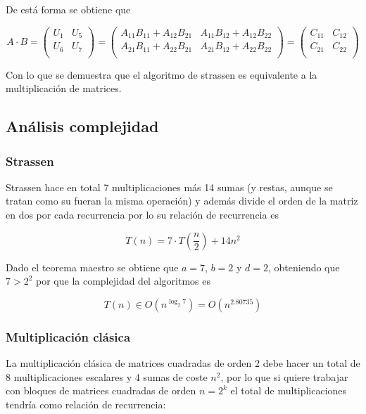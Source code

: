 \documentclass[12pt,letterpaper]{scrartcl}
\begin{document}
De está forma se obtiene que

$$
A\cdot B =
\begin{pmatrix}
	U_1 & U_5\\
	U_6 & U_7\\
\end{pmatrix}
 = \begin{pmatrix}
A_{11} B_{11} + A_{12} B_{21} & A_{11} B_{12} + A_{12} B_{22}\\
A_{21} B_{11} + A_{22} B_{21} & A_{21} B_{12} + A_{22} B_{22}\\
\end{pmatrix}
=
\begin{pmatrix}
C_{11} & C_{12} \\
C_{21} & C_{22}\\
\end{pmatrix}
$$

Con  lo que se demuestra que el algoritmo de strassen es equivalente a la multiplicación de matrices.

\subsection{Análisis complejidad}

\subsubsection{Strassen}

Strassen hace en total 7 multiplicaciones más 14 sumas (y restas, aunque se tratan como su fueran la misma operación) y además divide el orden de la matriz en dos por cada recurrencia por lo su relación de recurrencia es

$$ T(n) = 7 \cdot T \left ( \dfrac{n}{2} \right ) + 14n^2 $$

Dado el teorema maestro se obtiene que $a = 7$, $b = 2$ y $d = 2$, obteniendo que $7 > 2^2$ por que la complejidad del algoritmos es

$$T(n) \in O(n^{\log_2 7}) = O ( n^{2.80735} )$$

\subsubsection{Multiplicación clásica}

La multiplicación clásica de matrices cuadradas de orden 2 debe hacer un total de 8 multiplicaciones escalares y 4 sumas de coste $n^2$, por lo que si quiere trabajar con bloques de matrices cuadradas de orden $n = 2^k$ el total de multiplicaciones tendría como relación de recurrencia:
\end{document}
